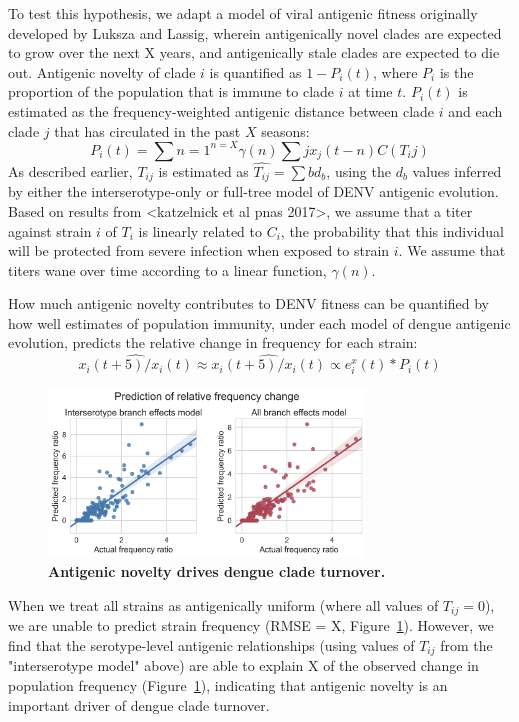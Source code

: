 \documentclass[11pt,oneside,letterpaper]{article}
\begin{document}
To test this hypothesis, we adapt a model of viral antigenic fitness originally developed by Luksza and Lassig, wherein antigenically novel clades are expected to grow over the next X years, and antigenically stale clades are expected to die out.
Antigenic novelty of clade $i$ is quantified as $1 - P_i(t)$, where $P_i$ is the proportion of the population that is immune to clade $i$ at time $t$.
$P_i(t)$ is estimated as the frequency-weighted antigenic distance between clade $i$ and each clade $j$ that has circulated in the past $X$ seasons:  $$P_i(t) = \sum{n=1}^{n=X} \gamma(n) \sum{j} x_j(t-n) C(T_ij)$$
As described earlier, $T_{ij}$ is estimated as $\hat{T_{ij}} = \sum{b} d_b$, using the $d_b$ values inferred by either the interserotype-only or full-tree model of DENV antigenic evolution.
Based on results from <katzelnick et al pnas 2017>, we assume that a titer against strain $i$ of $T_i$ is linearly related to $C_i$, the  probability that this individual will be protected from severe infection when exposed to strain $i$.
We assume that titers wane over time according to a linear function, $\gamma(n)$.

How much antigenic novelty contributes to DENV fitness can be quantified by how well estimates of population immunity, under each model of dengue antigenic evolution, predicts the relative change in frequency for each strain: $$\hat{x_i(t+5)/x_i(t)} \approx \hat{x_i(t+5)/x_i(t)} \propto e^x_i(t) * P_i(t)$$

\begin{figure}[h]
 \centering
	\includegraphics[width=0.75\textwidth]{figs/frequency_predictions.png}
	\caption{\textbf{
Antigenic novelty drives dengue clade turnover.
}}
	\label{frequency_predictions}
\end{figure}

When we treat all strains as antigenically uniform (where all values of $T_{ij} = 0$), we are unable to predict strain frequency (RMSE = X, Figure~\ref{frequency_predictions}).
However, we find that the serotype-level antigenic relationships (using values of $T_{ij}$ from the "interserotype model" above) are able to explain X of the observed change in population frequency (Figure~\ref{frequency_predictions}), indicating that antigenic novelty is an important driver of dengue clade turnover.
\end{document}
